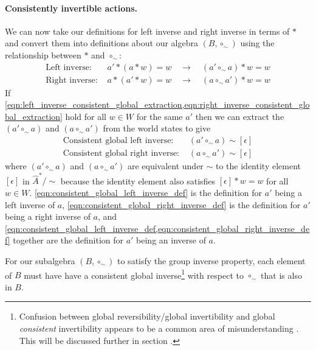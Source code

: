\paragraph{Consistently invertible actions.}
We can now take our definitions for left inverse and right inverse in terms of $\ast$ and convert them into definitions about our algebra $(B, \circ_{\sim})$ using the relationship between $\ast$ and $\circ_{\sim}$:
\begin{align}
    \text{Left inverse: } & a' * (a * w) = w \quad \to \quad (a' \circ_{\sim} a) \ast w = w
    \label{eqn:left_inverse_consistent_global_extraction} \\
    \text{Right inverse: } & a * (a' * w) = w \quad \to \quad (a \circ_{\sim} a') \ast w = w
    \label{eqn:right_inverse_consistent_global_extraction}
\end{align}
If \cref{eqn:left_inverse_consistent_global_extraction,eqn:right_inverse_consistent_global_extraction} hold for all $w \in W$ for the same $a'$ then we can extract the $(a' \circ_{\sim} a)$ and $(a \circ_{\sim} a')$ from the world states to give
\begin{align}
    \text{Consistent global left inverse: } & (a' \circ_{\sim} a) \sim [\epsilon] 
    \label{eqn:consistent_global_left_inverse_def} \\
    \text{Consistent global right inverse: } & (a \circ_{\sim} a') \sim [\epsilon]
    \label{eqn:consistent_global_right_inverse_def}
\end{align}
where $(a' \circ_{\sim} a)$ and $(a \circ_{\sim} a')$ are equivalent under $\sim$ to the identity element $[\epsilon]$ in $\hat{A}^{*}/\sim$ because the identity element also satisfies $[\epsilon] \ast w = w$ for all $w \in W$.
\cref{eqn:consistent_global_left_inverse_def} is the definition for $a'$ being a left inverse of $a$, \cref{eqn:consistent_global_right_inverse_def} is the definition for $a'$ being a right inverse of $a$, and \cref{eqn:consistent_global_left_inverse_def,eqn:consistent_global_right_inverse_def} together are the definition for $a'$ being an inverse of $a$.

For our subalgebra $(B, \circ_{\sim})$ to satisfy the group inverse property, each element of $B$ must have have a consistent global inverse\footnote{
Confusion between global reversibility/global invertibility and global \emph{consistent} invertibility appears to be a common area of misunderstanding .
This will be discussed further in section .
} with respect to $\circ_{\sim}$ that is also in $B$.

